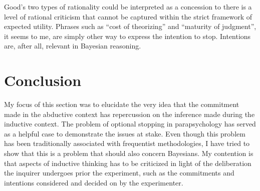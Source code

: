 Good's two types of rationality could be interpreted as a concession to
there is a level of rational criticism that cannot be captured within
the strict framework of expected utility. Phrases such as ``cost of
theorizing'' and ``maturity of judgment'', it seems to me, are simply
other way to express the intention to stop. Intentions are, after all,
relevant in Bayesian reasoning.

\section{Conclusion}\label{stoppingcon}

My focus of this section was to elucidate the very idea that the commitment made in the abductive context has  repercussion on the inference made during the inductive context. The problem of optional stopping in parapsychology has served as a helpful case to demonstrate the issues at stake. Even though this problem has been traditionally associated with frequentist methodologies, I have tried to show that this is a problem that should also concern Bayesians. My contention is that aspects of inductive thinking has to be criticized in light of the deliberation the inquirer undergoes prior the experiment, such as the commitments and intentions considered and decided on by the experimenter. 

